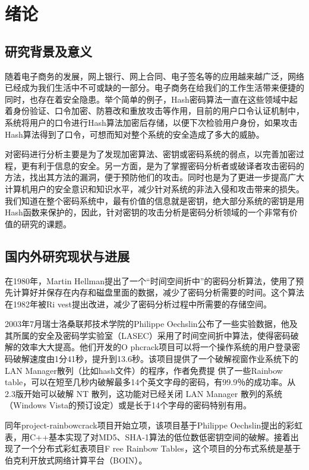 \chapter{绪论}
\section{研究背景及意义}
随着电子商务的发展，网上银行、网上合同、电子签名等的应用越来越广泛，网络已经成为我们生活中不可或缺的一部分。电子商务在给我们的工作生活带来便捷的同时，也存在着安全隐患。举个简单的例子，Hash密码算法一直在这些领域中起着身份验证、口令加密、防篡改和重放攻击等作用，目前的用户口令认证机制中，系统将用户的口令进行Hash算法加密后存储，以便下次检验用户身份，如果攻击Hash算法得到了口令，可想而知对整个系统的安全造成了多大的威胁。

对密码进行分析主要是为了发现加密算法、密钥或密码系统的弱点，以完善加密过程，更有利于信息的安全。另一方面，是为了掌握密码分析者或破译者攻击密码的方法，找出其方法的漏洞，便于预防他们的攻击。同时也是为了更进一步提高广大计算机用户的安全意识和知识水平，减少针对系统的非法入侵和攻击带来的损失。我们知道在整个密码系统中，最有价值的信息就是密钥，绝大部分系统的密钥是用Hash函数来保护的，因此，针对密钥的攻击分析是密码分析领域的一个非常有价值的研究的课题。

\section{国内外研究现状与进展}
在1980年，Martin Hellman\cite{hellman}提出了一个“时间空间折中”的密码分析算法，使用了预先计算好并保存在内存和磁盘里面的数据，减少了密码分析需要的时间。这个算法在1982年被Ri
vest提出改进，减少了密码分析过程中所需要的存储空间。  

2003年7月瑞士洛桑联邦技术学院的Philippe Oechslin公布了一些实验数据，他及其所属的安全及密码学实验室（LASEC）采用了时间空间折中算法，使得密码破解的效率大大提高。他们开发的O
phcrack项目可以将一个操作系统的用户登录密码破解速度由1分41秒，提升到13.6秒\cite{PO}。该项目提供了一个破解视窗作业系统下的LAN Manager散列（比如hash文件）的程序，作者免费提
供了一些Rainbow table，可以在短至几秒内破解最多14个英文字母的密码，有99.9％的成功率。从2.3版开始可以破解 NT 散列，这功能对已经关闭 LAN Manager 散列的系统（Windows Vista的预订设定）或是长于14个字母的密码特别有用。

同年project-rainbowcrack项目开始立项，该项目基于Philippe Oechslin提出的彩虹表，用C++基本实现了对MD5、SHA-1算法的低位数低密钥空间的破解\cite{zhu}。接着出现了一个分布式彩虹表项目F
ree Rainbow Tables，这个项目的分布式系统是基于伯克利开放式网络计算平台（BOIN）。

